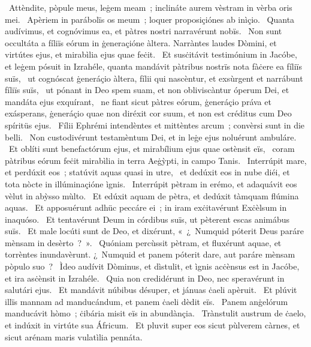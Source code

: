 ~Attèndite, pòpule meus, leġem meam~; inclináte aurem vèstram in vèrba oris mei. 
~Apèriem in parábolïs os meum~; loquer proposiçiónes ab inìçio. 
~Quanta audívimus, et cognóvimus ea, et pàtres nostri narravérunt nobïs. 
~Non sunt occultáta a fíliïs eórum in ġeneraçióne àltera. Narràntes laudes Dòmini, et virtútes ejus, et mirabìlia ejus quae feċit. 
~Et susċitávit testimónium in Jacóbe, et leġem pósuit in Izrahéle, quanta mandávit pàtribus nostrïs nota fàċere ea fíliïs suïs, 
~ut cognóscat ġeneráçio àltera, fílii qui nascèntur, et exsùrgent et narrábunt fíliïs suïs, 
~ut pónant in Deo spem suam, et non obliviscàntur óperum Dei, et mandáta ejus exquírant, 
~ne fiant sicut pàtres eórum, ġeneráçio práva et exásperans, ġeneráçio quae non diréxit cor suum, et non est créditus cum Deo spíritüs ejus. 
~Fílii Ephrémi intendèntes et mittèntes arcum~; convèrsi sunt in die belli. 
~Non custodivérunt testamèntum Dei, et in leġe ejus noluérunt ambuláre. 
~Et oblíti sunt benefactórum ejus, et mirabílium ejus quae ostènsit eïs, 
~coram pàtribus eórum feċit mirabìlia in terra Aeġỳpti, in campo Tanis. 
~Interrúpit mare, et perdúxit eos~; statúvit aquas quasi in utre, 
~et dedúxit eos in nube diéi, et tota nòcte in illúminaçióne ìgnis. 
~Interrúpit pètram in erémo, et adaquávit eos vèlut in abỳsso mùlto. 
~Et edúxit aquam de pètra, et dedúxit tàmquam flúmina aquas. 
~Et apposuérunt adhüc peccáre ei~; in iram exċitavérunt Exċèlsum in inaquóso. 
~Et tentavérunt Deum in córdibus suïs, ut pèterent escas animábus suïs. 
~Et male locúti sunt de Deo, et dixérunt, «~¿~Numquid póterit Deus paráre mènsam in desèrto~?~». 
~Quóniam percùssit pètram, et fluxérunt aquae, et torrèntes inundavèrunt. ¿~Numquid et panem póterit dare, aut paráre mènsam pòpulo suo~? 
~Ìdeo audívit Dòminus, et dìstulit, et ìgnis acċènsus est in Jacóbe, et ira asċènsit in Izrahéle. 
~Quia non credidérunt in Deo, nec speravérunt in salutári ejus. 
~Et mandávit núbibus désuper, et jánuas ċaeli apèruit. 
~Et plúvit illïs mannam ad manducándum, et panem ċaeli dèdit eïs. 
~Panem anġelórum manducávit hòmo~; ċibária misit eïs in abundànçia. 
~Trànstulit austrum de ċaelo, et indúxit in virtúte sua Áfricum. 
~Et pluvit super eos sicut pùlverem càrnes, et sicut arénam maris vulatìlia pennáta. 
